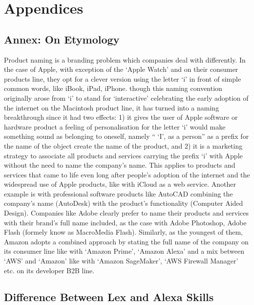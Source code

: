 \chapter*{Appendices}
\label{appendices}


\section*{Annex: On Etymology}
\label{etymology}

Product naming is a branding problem which companies deal with differently. In the case of Apple, with exception of the `Apple Watch' and on their consumer products line, they opt for a clever version using the letter `i' in front of simple common words, like iBook, iPad, iPhone. though this naming convention originally arose from `i' to stand for `interactive' celebrating the early adoption of the internet on the Macintosh product line, it has turned into a naming breakthrough since it had two effects: 1) it gives the user of Apple software or hardware product a feeling of personalisation for the letter `i' would make something sound as belonging to oneself, namely `` `I', as a person'' as a prefix for the name of the object create the name of the product, and 2) it is a marketing strategy to associate all products and services carrying the prefix `i' with Apple without the need to name the company's name. This applies to products and services that came to life even long after people's adoption of the internet and the widespread use of Apple products, like with iCloud as a web service. Another example is with professional software products like AutoCAD combining the company's name (AutoDesk) with the product's functionality  (Computer Aided Design). Companies like Adobe clearly prefer to name their products and services with their brand's full name included, as the case with Adobe Photoshop, Adobe Flash (formely know as MacroMedia Flash). Similarly, as the youngest of them, Amazon adopts a combined approach by stating the full name of the company on its consumer line like with `Amazon Prime', `Amazon Alexa' and a mix between `AWS' and `Amazon' like with `Amazon SageMaker', `AWS Firewall Manager' etc. on its developer B2B line.  




\section*{Difference Between Lex and Alexa Skills}
\label{lexAlexa}  

